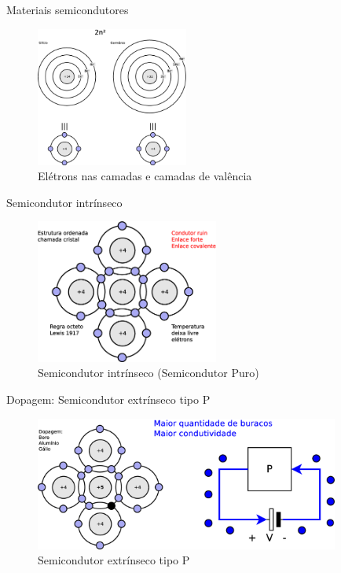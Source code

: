 \documentclass[envcountsect,dvips]{beamer}
\begin{document}
\begin{frame}{Materiais semicondutores}
\begin{figure}
\centering
\includegraphics[width=5cm]{images/sige.eps}
\caption{Elétrons nas camadas e camadas de valência}
\label{fig:sige}
\end{figure}
\end{frame}

\begin{frame}{Semicondutor intrínseco}
\begin{figure}
\centering
\includegraphics[width=6cm]{images/covalente.eps}
\caption{Semicondutor intrínseco (Semicondutor Puro)}
\label{fig:sige}
\end{figure}
\end{frame}

\begin{frame}{Dopagem: Semicondutor extrínseco tipo P}
\begin{figure}
\centering
\includegraphics[width=10cm]{images/extrinsecop.eps}
\caption{Semicondutor extrínseco tipo P}
\label{fig:semip}
\end{figure}
\end{frame}
\end{document}
